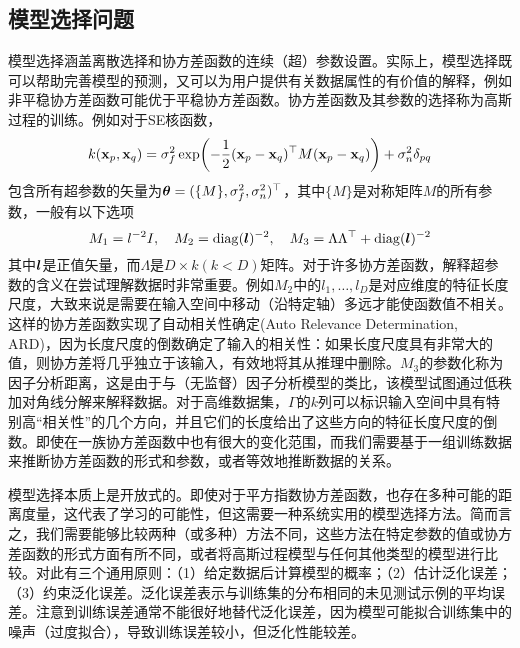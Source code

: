 \documentclass[12pt,UTF8]{article}
\begin{document}
        \subsection{模型选择问题}
            模型选择涵盖离散选择和协方差函数的连续（超）参数设置。实际上，模型选择既可以帮助完善模型的预测，又可以为用户提供有关数据属性的有价值的解释，例如非平稳协方差函数可能优于平稳协方差函数。协方差函数及其参数的选择称为高斯过程的训练。例如对于SE核函数，
            \begin{equation}
                k(\vb{x}_p,\vb{x}_q)=\sigma_f^2\exp(-\frac{1}{2}(\vb{x}_p-\vb{x}_q)^\top M(\vb{x}_p-\vb{x}_q))+\sigma_n^2\delta_{pq}
            \end{equation}
            包含所有超参数的矢量为$\vb*{\theta}=(\{M\},\sigma_f^2,\sigma_n^2)^\top$，其中$\{M\}$是对称矩阵$M$的所有参数，一般有以下选项
            \begin{equation}
                M_1=l^{-2}I\qc M_2=\mathrm{diag}(\vb*{l})^{-2}\qc M_3=\Lambda\Lambda^\top+\mathrm{diag}(\vb*{l})^{-2}
            \end{equation}
            其中$\vb*{l}$是正值矢量，而$\Lambda$是$D\times k(k<D)$矩阵。对于许多协方差函数，解释超参数的含义在尝试理解数据时非常重要。例如$M_2$中的$l_1,\dots,l_D$是对应维度的特征长度尺度，大致来说是需要在输入空间中移动（沿特定轴）多远才能使函数值不相关。这样的协方差函数实现了自动相关性确定(Auto Relevance Determination, ARD)，因为长度尺度的倒数确定了输入的相关性：如果长度尺度具有非常大的值，则协方差将几乎独立于该输入，有效地将其从推理中删除。$M_3$的参数化称为因子分析距离，这是由于与（无监督）因子分析模型的类比，该模型试图通过低秩加对角线分解来解释数据。对于高维数据集，$\Gamma$的$k$列可以标识输入空间中具有特别高“相关性”的几个方向，并且它们的长度给出了这些方向的特征长度尺度的倒数。即使在一族协方差函数中也有很大的变化范围，而我们需要基于一组训练数据来推断协方差函数的形式和参数，或者等效地推断数据的关系。\par
            模型选择本质上是开放式的。即使对于平方指数协方差函数，也存在多种可能的距离度量，这代表了学习的可能性，但这需要一种系统实用的模型选择方法。简而言之，我们需要能够比较两种（或多种）方法不同，这些方法在特定参数的值或协方差函数的形式方面有所不同，或者将高斯过程模型与任何其他类型的模型进行比较。对此有三个通用原则：（1）给定数据后计算模型的概率；（2）估计泛化误差；（3）约束泛化误差。泛化误差表示与训练集的分布相同的未见测试示例的平均误差。注意到训练误差通常不能很好地替代泛化误差，因为模型可能拟合训练集中的噪声（过度拟合），导致训练误差较小，但泛化性能较差。\par
\end{document}
